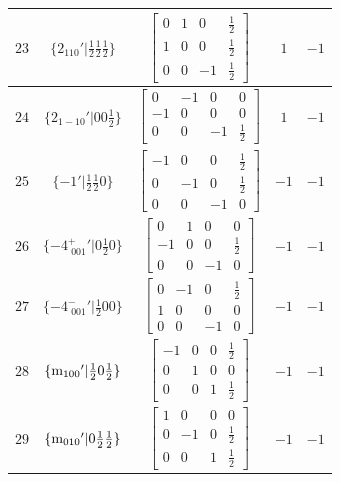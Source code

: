 \documentclass[fleqn,8pt]{jsarticle}
\begin{document}
\begin{longtable}{ccccc}
$ 23 $ & $ \{2{}_{110}{}'|\frac{1}{2} \frac{1}{2} \frac{1}{2}\} $ & $ \begin{bmatrix} 0 & 1 & 0 & \frac{1}{2} \\ 1 & 0 & 0 & \frac{1}{2} \\ 0 & 0 & -1 & \frac{1}{2} \end{bmatrix} $ & $ 1 $ & $ -1 $ \\ \hline
$ 24 $ & $ \{2{}_{1-10}{}'|0 0 \frac{1}{2}\} $ & $ \begin{bmatrix} 0 & -1 & 0 & 0 \\ -1 & 0 & 0 & 0 \\ 0 & 0 & -1 & \frac{1}{2} \end{bmatrix} $ & $ 1 $ & $ -1 $ \\ \hline
$ 25 $ & $ \{-1{}'|\frac{1}{2} \frac{1}{2} 0\} $ & $ \begin{bmatrix} -1 & 0 & 0 & \frac{1}{2} \\ 0 & -1 & 0 & \frac{1}{2} \\ 0 & 0 & -1 & 0 \end{bmatrix} $ & $ -1 $ & $ -1 $ \\ \hline
$ 26 $ & $ \{-4^{+}_{\,\,001}{}'|0 \frac{1}{2} 0\} $ & $ \begin{bmatrix} 0 & 1 & 0 & 0 \\ -1 & 0 & 0 & \frac{1}{2} \\ 0 & 0 & -1 & 0 \end{bmatrix} $ & $ -1 $ & $ -1 $ \\ \hline
$ 27 $ & $ \{-4^{-}_{\,\,001}{}'|\frac{1}{2} 0 0\} $ & $ \begin{bmatrix} 0 & -1 & 0 & \frac{1}{2} \\ 1 & 0 & 0 & 0 \\ 0 & 0 & -1 & 0 \end{bmatrix} $ & $ -1 $ & $ -1 $ \\ \hline
$ 28 $ & $ \{{\rm m}_{100}{}'|\frac{1}{2} 0 \frac{1}{2}\} $ & $ \begin{bmatrix} -1 & 0 & 0 & \frac{1}{2} \\ 0 & 1 & 0 & 0 \\ 0 & 0 & 1 & \frac{1}{2} \end{bmatrix} $ & $ -1 $ & $ -1 $ \\ \hline
$ 29 $ & $ \{{\rm m}_{010}{}'|0 \frac{1}{2} \frac{1}{2}\} $ & $ \begin{bmatrix} 1 & 0 & 0 & 0 \\ 0 & -1 & 0 & \frac{1}{2} \\ 0 & 0 & 1 & \frac{1}{2} \end{bmatrix} $ & $ -1 $ & $ -1 $ \\ \hline

\end{longtable}
\end{document}
